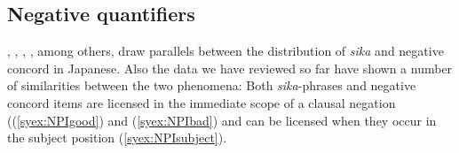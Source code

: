 \documentclass[output=paper]{langscibook}
\begin{document}

    
    


    





\subsection{Negative quantifiers}\label{sysc:negq}

\citet{aoyagi94}, \citet{kawahara08a}, \citet{tanaka97a}, \citet{yoshimura2007b}, among others, draw parallels between the distribution of \emph{sika} and negative concord in Japanese.
Also the data we have reviewed so far have shown a number of similarities between the two phenomena: Both \emph{sika}-phrases and negative concord items are licensed in the immediate scope of a clausal negation ((\ref{syex:NPIgood}) and (\ref{syex:NPIbad}) and can be licensed when they occur in the subject position (\ref{syex:NPIsubject}).


\z
\end{document}
